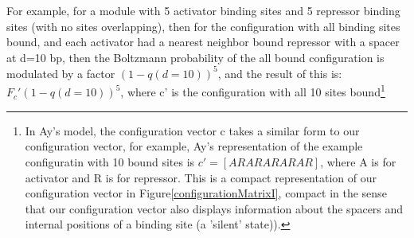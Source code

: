  For example, for a module with 5 activator binding sites and 5 repressor binding sites (with no sites overlapping), then for the configuration with all binding sites bound, and each activator had a nearest neighbor bound repressor with a spacer at d=10 bp, then the Boltzmann probability of the all bound configuration is modulated by a factor $(1-q(d=10))^{5}$, and the result of this is: $F_c'(1-q(d=10))^{5}$, where c' is the configuration with all 10 sites bound\footnote{In Ay's model, the configuration vector c takes a similar form to our configuration vector, for example, Ay's representation of the example configuratin with 10 bound sites is $c'=[ARARARARAR]$, where A is for activator and R is for repressor.  This is a compact representation of our configuration vector in Figure\ref{configurationMatrixI}, compact in the sense that our configuration vector also displays information about the spacers and internal positions of a binding site (a 'silent' state)).}
 
